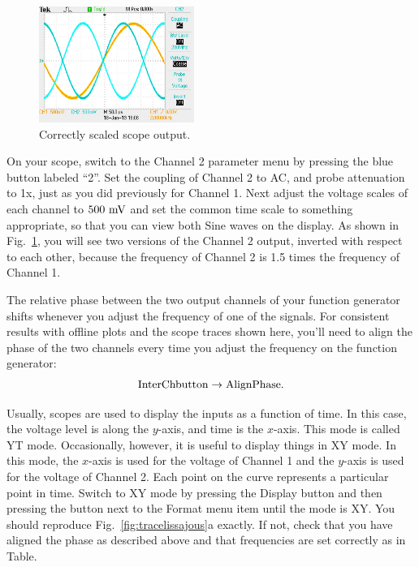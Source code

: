 \begin{figure}[htbp]
\begin{center}
\includegraphics[width=0.45\textwidth]{figs/labs/lissajous/two_sine.jpg} 
\caption{Correctly scaled scope output.}
\label{fig:twosine}
\end{center}
\end{figure}

On your scope, switch to the Channel 2 parameter menu by pressing the
blue button labeled ``2''.  Set the coupling of Channel 2 to AC, and
probe attenuation to 1x, just as you did previously for Channel 1.
Next adjust the voltage scales of each channel to $500~\rm mV$ and set
the common time scale to something appropriate, so that you can view
both Sine waves on the display.  As shown in Fig.~\ref{fig:twosine},
you will see two versions of the Channel 2 output, inverted with
respect to each other, because the frequency of Channel 2 is 1.5 times
the frequency of Channel 1.  

The relative phase between the two output channels of your function
generator shifts whenever you adjust the frequency of one of the
signals.  For consistent results with offline plots and the scope
traces shown here, you'll need to align the phase of the two channels
every time you adjust the frequency on the function generator:
\begin{displaymath}
\rm Inter Ch button \to AlignPhase.
\end{displaymath}

Usually, scopes are used to display the inputs as a function of time.
In this case, the voltage level is along the $y$-axis, and time is the
$x$-axis.  This mode is called YT mode.  Occasionally, however, it is
useful to display things in XY mode.  In this mode, the $x$-axis is
used for the voltage of Channel 1 and the $y$-axis is used for the
voltage of Channel 2.  Each point on the curve represents a particular
point in time.  Switch to XY mode by pressing the Display button and
then pressing the button next to the Format menu item until the mode
is XY.  You should reproduce Fig.~\ref{fig:tracelissajous}a
exactly.  If not, check that you have aligned the phase as described
above and that frequencies are set correctly as in Table.

